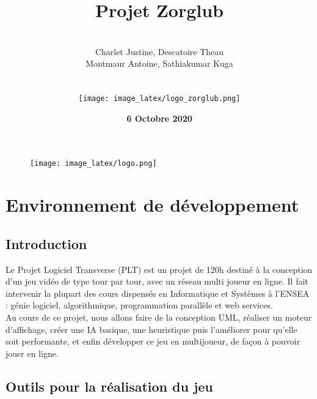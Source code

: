 \documentclass[a4paper,12pt]{report}
\begin{document}
	\begin{figure}
		\texttt{[image: image\_latex/logo.png]}
	\end{figure}

	
	\title{\textbf{Projet Zorglub}}
	\author{\hline \\ Charlet Justine, Descatoire Theau \\ Montmaur Antoine,  Sathiakumar Kuga \\ \\ \hline \\  \texttt{[image: image\_latex/logo\_zorglub.png]} }
	
	
	\date{\textbf{ 6 Octobre 2020}}

	
	
	
	
	
	
	\maketitle
	\tableofcontents
	
	
	
	
	
	
	
	
	
	
	\chapter{Environnement de développement}
	\section{Introduction}
	Le Projet Logiciel Transverse (PLT) est un projet de 120h destiné à la conception d'un jeu vidéo de type tour par tour, avec un réseau multi joueur en ligne. Il fait intervenir la plupart des cours dispensés en Informatique et Systèmes à l'ENSEA : génie logiciel, algorithmique, programmation parallèle et web services. \\
	\indent Au cours de ce projet, nous allons faire de la conception UML, réaliser un moteur d'affichage, créer une IA basique, une heuristique puis l'améliorer pour qu'elle soit performante, et enfin développer ce jeu en multijoueur, de façon à pouvoir jouer en ligne.


	
	\section{Outils pour la réalisation du jeu}
	
\end{document}
